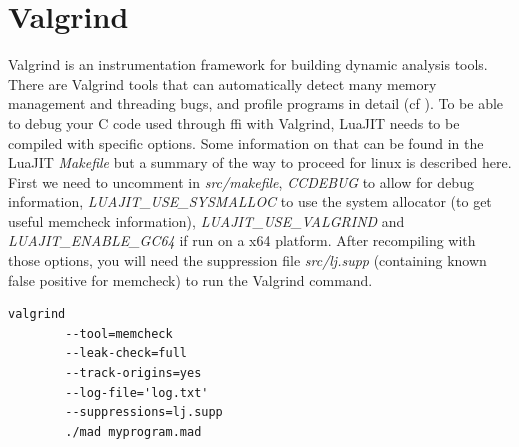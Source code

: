 
\section{Valgrind}
\label{Sec:Valgrind}
    
    Valgrind is an instrumentation framework for building dynamic analysis tools.
There are Valgrind tools that can automatically detect many memory management
and threading bugs, and profile programs in detail (cf \cite{valgrind}). To be
able to debug your C code used through ffi with Valgrind, LuaJIT needs to be
compiled with specific options. Some information on that can be found in the
LuaJIT \emph{Makefile} but a summary of the way to proceed for linux is described
here. First we need to uncomment in \emph{src/makefile}, \emph{CCDEBUG} to
allow for debug information, \emph{LUAJIT\_USE\_SYSMALLOC} to use the system
allocator (to get useful memcheck information), \emph{LUAJIT\_USE\_VALGRIND}
and \emph{LUAJIT\_ENABLE\_GC64} if run on a x64 platform. After recompiling
with those options, you will need the suppression file \emph{src/lj.supp}
(containing known false positive for memcheck) to run the Valgrind command.

\begin{lstlisting}[style=CStyle]
valgrind
		--tool=memcheck
		--leak-check=full
		--track-origins=yes
		--log-file='log.txt'
		--suppressions=lj.supp
		./mad myprogram.mad
\end{lstlisting}
